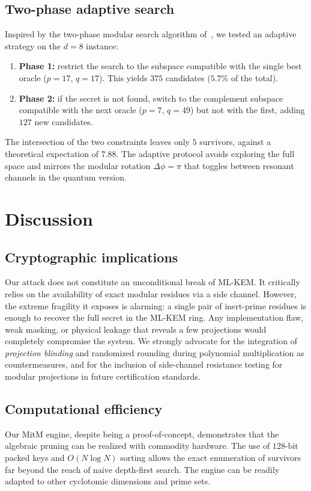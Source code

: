 \documentclass[12pt,a4paper]{article}
\begin{document}
\subsection{Two-phase adaptive search}
Inspired by the two-phase modular search algorithm of~\cite{Peinador2026Quantum}, we tested an adaptive strategy on the $d=8$ instance:
\begin{enumerate}
    \item \textbf{Phase 1:} restrict the search to the subspace compatible with the single best oracle ($p=17$, $q=17$). This yields $375$ candidates ($5.7\%$ of the total).
    \item \textbf{Phase 2:} if the secret is not found, switch to the complement subspace compatible with the next oracle ($p=7$, $q=49$) but not with the first, adding $127$ new candidates.
\end{enumerate}
The intersection of the two constraints leaves only $5$ survivors, against a theoretical expectation of $7.88$. The adaptive protocol avoids exploring the full space and mirrors the modular rotation $\Delta\phi = \pi$ that toggles between resonant channels in the quantum version.

\section{Discussion}
\label{sec:discussion}

\subsection{Cryptographic implications}
Our attack does not constitute an unconditional break of ML-KEM. It critically relies on the availability of exact modular residues via a side channel. However, the extreme fragility it exposes is alarming: a single pair of inert-prime residues is enough to recover the full secret in the ML-KEM ring. Any implementation flaw, weak masking, or physical leakage that reveals a few projections would completely compromise the system. We strongly advocate for the integration of \emph{projection blinding} and randomized rounding during polynomial multiplication as countermeasures, and for the inclusion of side-channel resistance testing for modular projections in future certification standards.

\subsection{Computational efficiency}
Our MitM engine, despite being a proof-of-concept, demonstrates that the algebraic pruning can be realized with commodity hardware. The use of $128$-bit packed keys and $O(N \log N)$ sorting allows the exact enumeration of survivors far beyond the reach of naive depth-first search. The engine can be readily adapted to other cyclotomic dimensions and prime sets.
\end{document}
